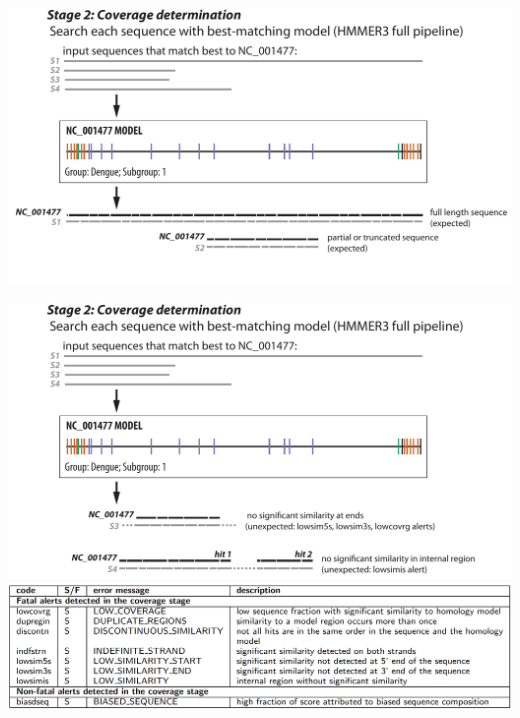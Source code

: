 \documentclass[landscape]{slides}
\begin{document}
\begin{slide}
\begin{center}

\includegraphics[width=10.5in]{figs/v-annotate-stage2-1}

\end{center}
\vfill
\end{slide}
\begin{slide}
\begin{center}

\includegraphics[width=10.5in]{figs/v-annotate-stage2-2}
\includegraphics[width=10in]{figs/ss-coverage-alert-list}
\end{center}

\vfill
\end{slide}
\end{document}
